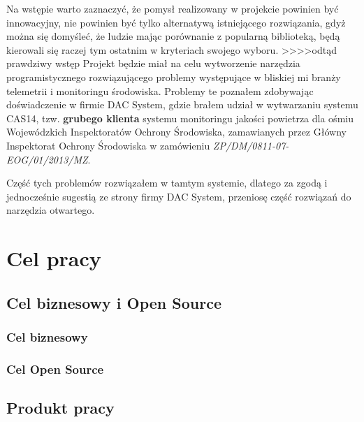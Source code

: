 Na wstępie warto zaznaczyć, że pomysł realizowany w projekcie powinien być innowacyjny, nie powinien być tylko alternatywą istniejącego rozwiązania, gdyż można się domyśleć, że ludzie mając porównanie z popularną biblioteką, będą kierowali się raczej tym ostatnim w kryteriach swojego wyboru.
>>>>odtąd prawdziwy wstęp
Projekt będzie miał na celu wytworzenie narzędzia programistycznego rozwiązującego problemy występujące w bliskiej mi branży telemetrii i monitoringu środowiska. Problemy te poznałem zdobywając doświadczenie w firmie DAC System, gdzie brałem udział w wytwarzaniu systemu CAS14, tzw. \textbf{grubego klienta} systemu monitoringu jakości powietrza dla ośmiu Wojewódzkich Inspektoratów Ochrony Środowiska, zamawianych przez Główny Inspektorat Ochrony Środowiska w zamówieniu \textsl{ZP/DM/0811-07-EOG/01/2013/MZ}.

Część tych problemów rozwiązałem w tamtym systemie, dlatego za zgodą i jednocześnie sugestią ze strony firmy DAC System, przeniosę część rozwiązań do narzędzia otwartego.


\section{Cel pracy}

\subsection{Cel biznesowy i Open Source}

\subsubsection*{Cel biznesowy}
\subsubsection*{Cel Open Source}

\subsection{Produkt pracy}

